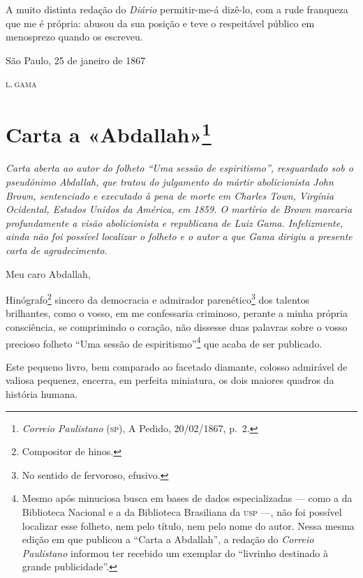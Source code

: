A muito distinta redação do \emph{Diário} permitir-me-á dizê-lo, com a
rude franqueza que me é própria: abusou da sua posição e teve o
respeitável público em menosprezo quando os escreveu.

\begin{flushright}
São Paulo, 25 de janeiro de 1867

\textsc{l.\,gama}
\end{flushright}

\chapter{Carta a «Abdallah»\footnote{\emph{Correio Paulistano}
  (\textsc{sp}), A Pedido, 20/02/1867, p.~2.}}

\begin{didascalia}\itshape
Carta aberta ao autor do folheto ``Uma sessão de espiritismo'',
resguardado sob o pseudônimo Abdallah, que tratou do julgamento
do mártir abolicionista John Brown, sentenciado e executado à pena de
morte em Charles Town, Virgínia Ocidental, Estados Unidos da América, em
1859. O martírio de Brown marcaria profundamente a visão abolicionista e
republicana de Luiz Gama. Infelizmente, ainda não foi possível localizar
o folheto e o autor a que Gama dirigiu a presente carta de
agradecimento.
\end{didascalia}




Meu caro Abdallah,

Hinógrafo\footnote{Compositor de hinos.} sincero da democracia e
admirador parenético\footnote{No sentido de fervoroso, efusivo.} dos
talentos brilhantes, como o vosso, em me confessaria criminoso, perante
a minha própria consciência, se comprimindo o coração, não dissesse duas
palavras sobre o vosso precioso folheto ``Uma sessão de
espiritismo''\footnote{Mesmo após minuciosa busca em bases de dados
  especializadas --- como a da Biblioteca Nacional e a da Biblioteca
  Brasiliana da \textsc{usp} ---, não foi possível localizar esse folheto, nem
  pelo título, nem pelo nome do autor. Nessa mesma edição em que
  publicou a ``Carta a Abdallah'', a redação do \emph{Correio
  Paulistano} informou ter recebido um exemplar do ``livrinho destinado à
  grande publicidade''.} que acaba de ser publicado.

Este pequeno livro, bem comparado ao facetado diamante, colosso
admirável de valiosa pequenez, encerra, em perfeita miniatura, os dois
maiores quadros da história humana.

